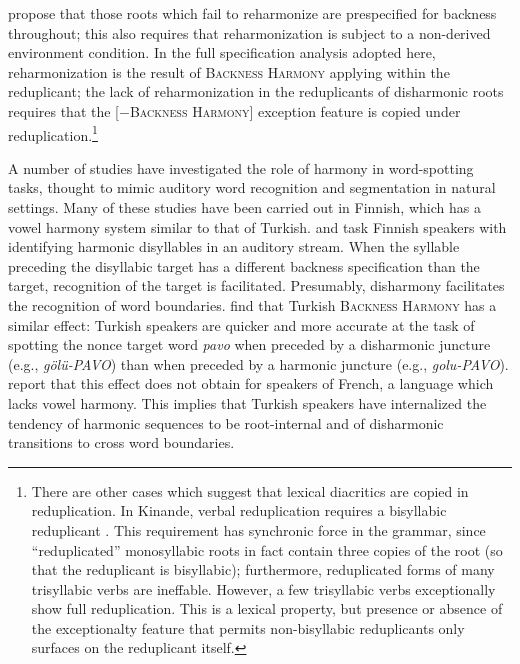 \noindent
\citeauthor{Harrison2001} propose that those roots which fail to reharmonize are prespecified for backness throughout; this also requires that reharmonization is subject to a non-derived environment condition.
In the full specification analysis adopted here, reharmonization is the result of \textsc{Backness Harmony} applying within the reduplicant; the lack of reharmonization in the reduplicants of disharmonic roots requires that the [$-$\textsc{Backness Harmony}] exception feature is copied under reduplication.\footnote{
    There are other cases which suggest that lexical diacritics are copied in reduplication.
    In Kinande, verbal reduplication requires a bisyllabic reduplicant \citep{Downing2000,Mutaka1990}.
    This requirement has synchronic force in the grammar, since ``reduplicated'' monosyllabic roots in fact contain three copies of the root (so that the reduplicant is bisyllabic); furthermore, reduplicated forms of many trisyllabic verbs are ineffable.
    However, a few trisyllabic verbs exceptionally show full reduplication.
    This is a lexical property, but presence or absence of the exceptionalty feature that permits non-bisyllabic reduplicants only surfaces on the reduplicant itself.}

A number of studies have investigated the role of harmony in word-spotting tasks, thought to mimic auditory word recognition and segmentation in natural settings.
    Many of these studies have been carried out in Finnish, which has a vowel harmony system similar to that of Turkish. 
    \citet{Suomi1997} and \citet{Vroomen1998} task Finnish speakers with identifying harmonic disyllables in an auditory stream. 
    When the syllable preceding the disyllabic target has a different backness specification than the target, recognition of the target is facilitated. Presumably, disharmony facilitates the recognition of word boundaries. 
    \citet{Kabak2010} find that Turkish \textsc{Backness Harmony} has a similar effect: Turkish speakers are quicker and more accurate at the task of spotting the nonce target word \emph{pavo} when preceded by a disharmonic juncture (e.g., \emph{gölü-PAVO}) than when preceded by a harmonic juncture (e.g., \emph{golu-PAVO}). 
    \citeauthor{Kabak2010} report that this effect does not obtain for speakers of French, a language which lacks vowel harmony. 
    This implies that Turkish speakers have internalized the tendency of harmonic sequences to be root-internal and of disharmonic transitions to cross word boundaries. 

